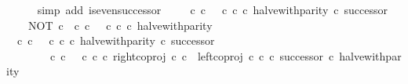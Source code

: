 \begin{isabellebody}
\ \ \ \ \isamarkupfalse%
\ {\isacharparenleft}{\kern0pt}simp\ add{\isacharcolon}{\kern0pt}\ is{\isacharunderscore}{\kern0pt}even{\isacharunderscore}{\kern0pt}successor{\isacharparenright}{\kern0pt}\isanewline
\isanewline
\ \ \isamarkupfalse%
\ {\isachardoublequoteopen}{\isacharparenleft}{\kern0pt}{\isacharparenleft}{\kern0pt}{\isasymt}\ {\isasymcirc}\isactrlsub c\ {\isasymbeta}\isactrlbsub {\isasymnat}\isactrlsub c\isactrlesub {\isacharparenright}{\kern0pt}\ {\isasymamalg}\ {\isacharparenleft}{\kern0pt}{\isasymf}\ {\isasymcirc}\isactrlsub c\ {\isasymbeta}\isactrlbsub {\isasymnat}\isactrlsub c\isactrlesub {\isacharparenright}{\kern0pt}\ {\isasymcirc}\isactrlsub c\ halve{\isacharunderscore}{\kern0pt}with{\isacharunderscore}{\kern0pt}parity{\isacharparenright}{\kern0pt}\ {\isasymcirc}\isactrlsub c\ successor\ {\isacharequal}{\kern0pt}\isanewline
\ \ \ \ NOT\ {\isasymcirc}\isactrlsub c\ {\isacharparenleft}{\kern0pt}{\isasymt}\ {\isasymcirc}\isactrlsub c\ {\isasymbeta}\isactrlbsub {\isasymnat}\isactrlsub c\isactrlesub {\isacharparenright}{\kern0pt}\ {\isasymamalg}\ {\isacharparenleft}{\kern0pt}{\isasymf}\ {\isasymcirc}\isactrlsub c\ {\isasymbeta}\isactrlbsub {\isasymnat}\isactrlsub c\isactrlesub {\isacharparenright}{\kern0pt}\ {\isasymcirc}\isactrlsub c\ halve{\isacharunderscore}{\kern0pt}with{\isacharunderscore}{\kern0pt}parity{\isachardoublequoteclose}\isanewline
\ \ \isamarkupfalse%
\ {\isacharminus}{\kern0pt}\isanewline
\ \ \ \ \isamarkupfalse%
\ {\isachardoublequoteopen}{\isacharparenleft}{\kern0pt}{\isacharparenleft}{\kern0pt}{\isasymt}\ {\isasymcirc}\isactrlsub c\ {\isasymbeta}\isactrlbsub {\isasymnat}\isactrlsub c\isactrlesub {\isacharparenright}{\kern0pt}\ {\isasymamalg}\ {\isacharparenleft}{\kern0pt}{\isasymf}\ {\isasymcirc}\isactrlsub c\ {\isasymbeta}\isactrlbsub {\isasymnat}\isactrlsub c\isactrlesub {\isacharparenright}{\kern0pt}\ {\isasymcirc}\isactrlsub c\ halve{\isacharunderscore}{\kern0pt}with{\isacharunderscore}{\kern0pt}parity{\isacharparenright}{\kern0pt}\ {\isasymcirc}\isactrlsub c\ successor\isanewline
\ \ \ \ \ \ {\isacharequal}{\kern0pt}\ {\isacharparenleft}{\kern0pt}{\isasymt}\ {\isasymcirc}\isactrlsub c\ {\isasymbeta}\isactrlbsub {\isasymnat}\isactrlsub c\isactrlesub {\isacharparenright}{\kern0pt}\ {\isasymamalg}\ {\isacharparenleft}{\kern0pt}{\isasymf}\ {\isasymcirc}\isactrlsub c\ {\isasymbeta}\isactrlbsub {\isasymnat}\isactrlsub c\isactrlesub {\isacharparenright}{\kern0pt}\ {\isasymcirc}\isactrlsub c\ {\isacharparenleft}{\kern0pt}right{\isacharunderscore}{\kern0pt}coproj\ {\isasymnat}\isactrlsub c\ {\isasymnat}\isactrlsub c\ {\isasymamalg}\ {\isacharparenleft}{\kern0pt}left{\isacharunderscore}{\kern0pt}coproj\ {\isasymnat}\isactrlsub c\ {\isasymnat}\isactrlsub c\ {\isasymcirc}\isactrlsub c\ successor{\isacharparenright}{\kern0pt}{\isacharparenright}{\kern0pt}\ {\isasymcirc}\isactrlsub c\ halve{\isacharunderscore}{\kern0pt}with{\isacharunderscore}{\kern0pt}parity{\isachardoublequoteclose}\isanewline

\end{isabellebody}
